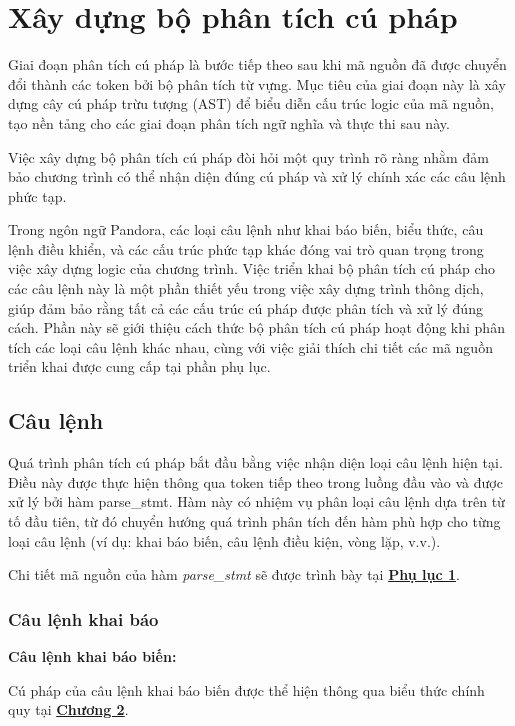 \section{Xây dựng bộ phân tích cú pháp}
Giai đoạn phân tích cú pháp là bước tiếp theo sau khi mã nguồn đã được chuyển đổi thành các token bởi bộ phân tích từ vựng. Mục tiêu của giai đoạn này là xây dựng cây cú pháp trừu tượng (AST) để biểu diễn cấu trúc logic của mã nguồn, tạo nền tảng cho các giai đoạn phân tích ngữ nghĩa và thực thi sau này. 

Việc xây dựng bộ phân tích cú pháp đòi hỏi một quy trình rõ ràng nhằm đảm bảo chương trình có thể nhận diện đúng cú pháp và xử lý chính xác các câu lệnh phức tạp.

Trong ngôn ngữ Pandora, các loại câu lệnh như khai báo biến, biểu thức, câu lệnh điều khiển, và các cấu trúc phức tạp khác đóng vai trò quan trọng trong việc xây dựng logic của chương trình. Việc triển khai bộ phân tích cú pháp cho các câu lệnh này là một phần thiết yếu trong việc xây dựng trình thông dịch, giúp đảm bảo rằng tất cả các cấu trúc cú pháp được phân tích và xử lý đúng cách. Phần này sẽ giới thiệu cách thức bộ phân tích cú pháp hoạt động khi phân tích các loại câu lệnh khác nhau, cùng với việc giải thích chi tiết các mã nguồn triển khai được cung cấp tại phần phụ lục.

\subsection{Câu lệnh}
Quá trình phân tích cú pháp bắt đầu bằng việc nhận diện loại câu lệnh hiện tại. Điều này được thực hiện thông qua token tiếp theo trong luồng đầu vào và được xử lý bởi hàm parse\_stmt. Hàm này có nhiệm vụ phân loại câu lệnh dựa trên từ tố đầu tiên, từ đó chuyển hướng quá trình phân tích đến hàm phù hợp cho từng loại câu lệnh (ví dụ: khai báo biến, câu lệnh điều kiện, vòng lặp, v.v.).

Chi tiết mã nguồn của hàm \textit{parse\_stmt} sẽ được trình bày tại \hyperref[ap1:stmt]{\bf Phụ lục 1}. %


\subsubsection{Câu lệnh khai báo}

\textbf{Câu lệnh khai báo biến:}

Cú pháp của câu lệnh khai báo biến được thể hiện thông qua biểu thức chính quy tại \hyperref[ch2:decl_var_stmt]{\bf Chương 2}.

